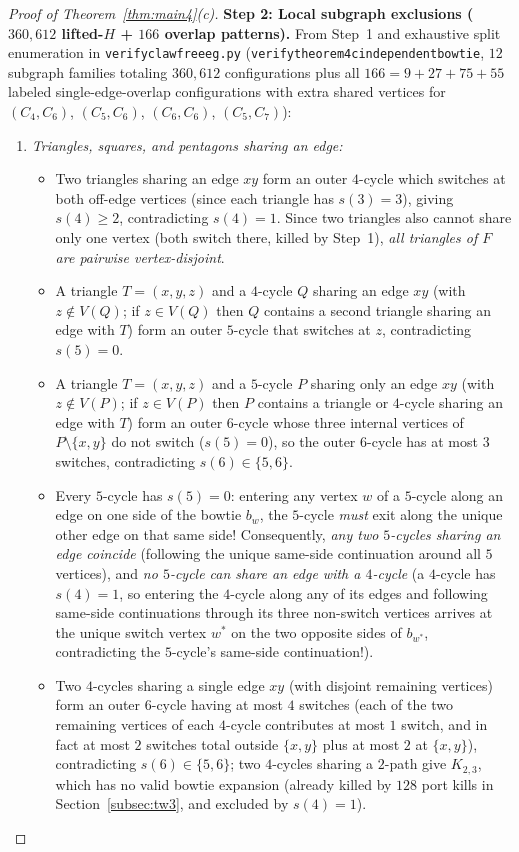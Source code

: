 \documentclass[11pt,reqno]{amsart}
\theoremstyle{plain}
\theoremstyle{definition}
\theoremstyle{remark}
\DeclareRobustCommand{\_}{\ifmmode\text{\textunderscore}\else\textunderscore\allowbreak\fi}
\begin{document}
\begin{proof}[Proof of Theorem~\ref{thm:main4}(c)]
\medskip
\noindent\textbf{Step 2: Local subgraph exclusions ($360{,}612$ lifted-$H$ + $166$ overlap patterns).}
From Step~1 and exhaustive split enumeration in \texttt{verify\_clawfree\_eg.py} (\texttt{verify\_theorem4c\_independent\_bowtie\_120}, $12$ subgraph families totaling $360{,}612$ configurations plus all $166 = 9 + 27 + 75 + 55$ labeled single-edge-overlap configurations with extra shared vertices for $(C_4, C_6)$, $(C_5, C_6)$, $(C_6, C_6)$, $(C_5, C_7)$):
\begin{enumerate}[label=(\roman*),leftmargin=2em]
  \item \emph{Triangles, squares, and pentagons sharing an edge:}
  \begin{itemize}[leftmargin=1.4em]
    \item Two triangles sharing an edge $xy$ form an outer $4$-cycle which switches at both off-edge vertices (since each triangle has $s(3) = 3$), giving $s(4) \ge 2$, contradicting $s(4) = 1$. Since two triangles also cannot share only one vertex (both switch there, killed by Step~1), \emph{all triangles of $F$ are pairwise vertex-disjoint}.
    \item A triangle $T = (x, y, z)$ and a $4$-cycle $Q$ sharing an edge $xy$ (with $z \notin V(Q)$; if $z \in V(Q)$ then $Q$ contains a second triangle sharing an edge with $T$) form an outer $5$-cycle that switches at $z$, contradicting $s(5) = 0$.
    \item A triangle $T = (x, y, z)$ and a $5$-cycle $P$ sharing only an edge $xy$ (with $z \notin V(P)$; if $z \in V(P)$ then $P$ contains a triangle or $4$-cycle sharing an edge with $T$) form an outer $6$-cycle whose three internal vertices of $P \setminus \{x, y\}$ do not switch ($s(5) = 0$), so the outer $6$-cycle has at most $3$ switches, contradicting $s(6) \in \{5, 6\}$.
    \item Every $5$-cycle has $s(5) = 0$: entering any vertex $w$ of a $5$-cycle along an edge on one side of the bowtie $b_w$, the $5$-cycle \emph{must} exit along the unique other edge on that same side! Consequently, \emph{any two $5$-cycles sharing an edge coincide} (following the unique same-side continuation around all $5$ vertices), and \emph{no $5$-cycle can share an edge with a $4$-cycle} (a $4$-cycle has $s(4) = 1$, so entering the $4$-cycle along any of its edges and following same-side continuations through its three non-switch vertices arrives at the unique switch vertex $w^*$ on the two opposite sides of $b_{w^*}$, contradicting the $5$-cycle's same-side continuation!).
    \item Two $4$-cycles sharing a single edge $xy$ (with disjoint remaining vertices) form an outer $6$-cycle having at most $4$ switches (each of the two remaining vertices of each $4$-cycle contributes at most $1$ switch, and in fact at most $2$ switches total outside $\{x, y\}$ plus at most $2$ at $\{x, y\}$), contradicting $s(6) \in \{5, 6\}$; two $4$-cycles sharing a $2$-path give $K_{2,3}$, which has no valid bowtie expansion (already killed by $128$ port kills in Section~\ref{subsec:tw3}, and excluded by $s(4) = 1$).

\end{itemize}
\end{enumerate}
\end{proof}
\end{document}
